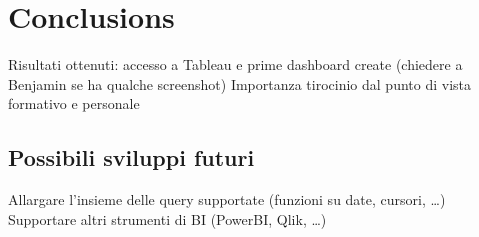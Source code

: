 \chapter{Conclusions}
\label{cha:conclusions}
Risultati ottenuti: accesso a Tableau e prime dashboard create (chiedere a Benjamin se ha qualche screenshot)
Importanza tirocinio dal punto di vista formativo e personale

\section{Possibili sviluppi futuri}
\label{sec:conclusions_future}
Allargare l'insieme delle query supportate (funzioni su date, cursori, \dots)
Supportare altri strumenti di BI (PowerBI, Qlik, \dots)